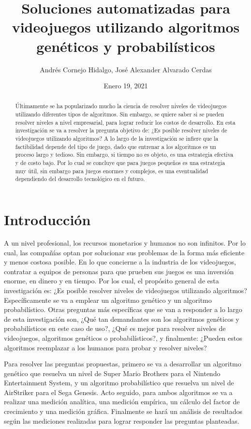 \documentclass{article}
\author{Andrés Cornejo Hidalgo, José Alexander Alvarado Cerdas}
\date{Enero 19, 2021}
\title{Soluciones automatizadas para videojuegos utilizando algoritmos genéticos y probabilísticos}
\begin{document}
\maketitle

\begin{abstract}
  Últimamente se ha popularizado mucho la ciencia de resolver niveles de videojuegos utilizando diferentes tipos de algoritmos. Sin embargo, se quiere saber si se pueden resolver niveles a nivel empresarial, para lograr reducir los costos de desarrollo. En esta investigación se va a resolver la pregunta objetivo de: ¿Es posible resolver niveles de videojuegos utilizando algoritmos? A lo largo de la investigación se infiere que la factibilidad depende del tipo de juego, dado que entrenar a los algoritmos es un proceso largo y tedioso. Sin embargo, si tiempo no es objeto, es una estrategia efectiva y de costo bajo. Por lo cual se concluye que para juegos pequeños es una estrategia muy útil, sin embargo para juegos enormes y complejos, es una eventualidad dependiendo del desarrollo tecnológico en el futuro.
\end{abstract}

\section{Introducción}
A un nivel profesional, los recursos monetarios y humanos no son infinitos. Por lo cual, las compañías optan por solucionar sus problemas de la forma más eficiente y menos costosa posible. En lo que concierne a la industria de los videojuegos, contratar a equipos de personas para que prueben sus juegos es una inversión enorme, en dinero y en tiempo. Por los cual, el propósito general de esta investigación es: ¿Es posible resolver niveles de videojuegos utilizando algoritmos? Específicamente se va a emplear un algoritmo genético y un algoritmo probabilístico.
Otras preguntas más específicas que se van a responder a lo largo de esta investigación son, ¿Qué tan demandantes son los algoritmos genéticos y probabilísticos en este caso de uso?, ¿Qué es mejor para resolver niveles de videojuegos, algoritmos genéticos o probabilísticos?, y finalmente: ¿Pueden estos algoritmos reemplazar a los humanos para probar y resolver niveles?

Para resolver las preguntas propuestas, primero se va a desarrollar un algoritmo genético que resuelva un nivel de Super Mario Brothers para el Nintendo Entertainment System, y un algoritmo probabilístico que resuelva un nivel de AirStriker para el Sega Genesis. Acto seguido, para ambos algoritmos se va a realizar una medición analítica, una medición empírica, un cálculo del factor de crecimiento y una medición gráfica. Finalmente se hará un análisis de resultados según las mediciones realizadas para lograr responder las preguntas planteadas.
\end{document}
